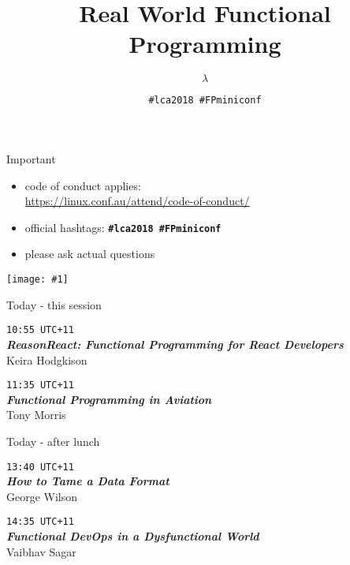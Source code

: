 \documentclass[ignorenonframetext,aspectratio=169]{beamer}
\title{\textbf{Real World Functional Programming}}
\author{\Huge $\lambda$}
\date{{\Large \tt \#lca2018 \#FPminiconf}}
\newcommand{\includegraphicsscaled}[1]{
    \texttt{[image: \#1]}
}
\begin{document}
\frame[plain]{\titlepage}

\begin{frame}{Important}
\begin{itemize}
    \item code of conduct applies:\\\url{https://linux.conf.au/attend/code-of-conduct/}
    \item official hashtags: {\bf \tt \#lca2018 \#FPminiconf}
    \item please ask actual questions
\end{itemize}
\end{frame}

\begin{frame}[plain]
    \begin{center}
    \includegraphicsscaled{diversity.png}
    \end{center}
\end{frame}

\begin{frame}{Today - this session}

{\Large \tt 10:55 UTC+11}\\
{\bf \em ReasonReact: Functional Programming for React Developers}\\
Keira Hodgkison

\bigskip

{\Large \tt 11:35 UTC+11}\\
{\bf \em Functional Programming in Aviation}\\
Tony Morris

\end{frame}

\begin{frame}{Today - after lunch}

{\Large \tt 13:40 UTC+11}\\
{\bf \em How to Tame a Data Format}\\
George Wilson

\bigskip

{\Large \tt 14:35 UTC+11}\\
{\bf \em Functional DevOps in a Dysfunctional World}\\
Vaibhav Sagar

\end{frame}
\end{document}
